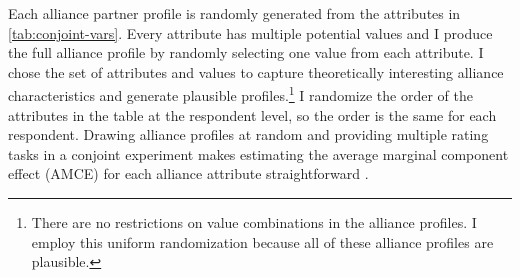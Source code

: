 \documentclass[12pt]{article}
\begin{document}
Each alliance partner profile is randomly generated from the attributes in \autoref{tab:conjoint-vars}.
Every attribute has multiple potential values and I produce the full alliance profile by randomly selecting one value from each attribute. 
I chose the set of attributes and values to capture theoretically interesting alliance characteristics and generate plausible profiles.\footnote{There are no restrictions on value combinations in the alliance profiles. I employ this uniform randomization because all of these alliance profiles are plausible.} %
I randomize the order of the attributes in the table at the respondent level, so the order is the same for each respondent. 
Drawing alliance profiles at random and providing multiple rating tasks in a conjoint experiment makes estimating the average marginal component effect (AMCE) for each alliance attribute straightforward \citep{Hainmuelleretal2014}. 
\end{document}
